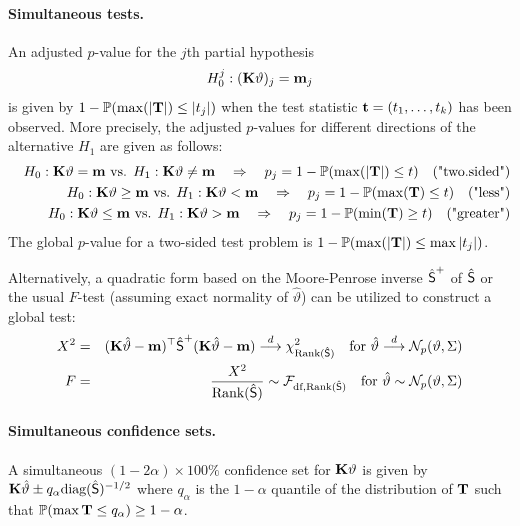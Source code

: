 \documentclass[12pt]{article}
\begin{document}
\paragraph{Simultaneous tests.}

An adjusted $p$-value for the $j$th partial hypothesis 
\begin{eqnarray*}
H_0^j: (\K \vartheta)_j = \m_j
\end{eqnarray*}
is given by $1 - \Prob(\max(|\T|) \le |t_j|)$ when the test statistic 
$\tt  = (t_1, \dots, t_k)$
has been observed. More precisely, the adjusted $p$-values for different
directions of the alternative $H_1$ are given as follows:
\begin{eqnarray*}
& & H_0: \K \vartheta = \m \text{ vs. } H_1: \K \vartheta \not = \m \quad \Rightarrow \quad p_j  =  1 - \Prob(\max(|\T|) \le t) \quad \text{("two.sided")} \\
& & H_0: \K \vartheta \ge \m \text{ vs. } H_1: \K \vartheta < \m  \quad \Rightarrow \quad p_j  =  1 - \Prob(\max(\T) \le t) \quad \text{("less")} \\
& & H_0: \K \vartheta \le \m \text{ vs. } H_1: \K \vartheta > \m \quad \Rightarrow \quad p_j  =  1 - \Prob(\min(\T) \ge t) \quad \text{("greater")} \\
\end{eqnarray*}
The global $p$-value for a two-sided test problem is $1 - \Prob(\max(|\T|) \le \max|t_j|)$.


Alternatively, a quadratic form based on the Moore-Penrose inverse $\hat{\S}^+$ of 
$\hat{\S}$ or the usual $F$-test (assuming exact normality of $\hat{\vartheta}$) 
can be utilized to construct a global test:
\begin{eqnarray*}
X^2 & = & (\K \hat{\vartheta} - \m)^\top \hat{\S}^+ (\K \hat{\vartheta} - \m) \cL \chi^2_{\Rg(\hat{\S})} 
\quad \text{for } \hat{\vartheta} \cL \N_p(\vartheta, \Sigma) \\
F & = &  \frac{X^2}{\Rg(\hat{\S})} \sim \F_{\text{df}, \Rg(\hat{\S})} \quad \text{for } \hat{\vartheta} \sim \N_p(\vartheta, \Sigma)
\end{eqnarray*}

\paragraph{Simultaneous confidence sets.}

A simultaneous $(1 - 2\alpha) \times 100\%$ 
confidence set for $\K \vartheta$ is given by 
$\K \hat{\vartheta} \pm q_\alpha \text{diag}(\hat{\S})^{-1/2}$
where $q_\alpha$ is the $1 - \alpha$ 
quantile of the distribution of $\T$ 
such that $\Prob(\max{\T} \le q_\alpha) \ge 1 - \alpha$.
\end{document}
